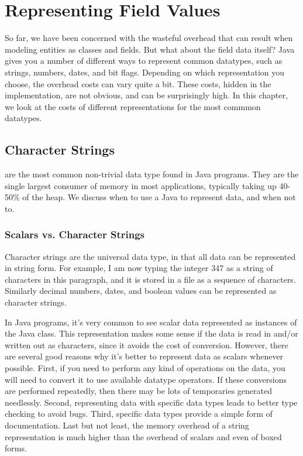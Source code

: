 \chapter{Representing Field Values}
\label{chapter:representing-values}

So far, we have been concerned with the wasteful overhead that can result when
modeling entities as classes and fields. But what about the field data
itself? Java gives you a number of different ways to represent common datatypes, such
as strings, numbers, dates, and bit flags. Depending on which
representation you choose, the overhead costs can vary quite a bit. 
These costs, hidden in the implementation, are not obvious, and can be
surprisingly high.
In this chapter, we look at the costs of different representations for the most 
commmon datatypes.

\section{Character Strings}
 are the most common non-trivial data type found in Java
programs. They are the single largest consumer of memory in most applications,
typically taking up 40-50\% of the heap. We discuss when to use a Java  to
represent data, and when not to.

\subsection{Scalars vs. Character Strings}
Character strings are the universal data type, in that all data can be
represented in string form.  For example, I am now typing the integer 347 as a
string of characters in this paragraph, and it is stored in a file as a sequence
of characters. Similarly decimal numbers, dates, and boolean values can be
represented as character strings.
 
In Java programs, it's very common to see scalar data represented as instances
of the Java  class. This representation makes some sense if the
data is read in and/or written out as characters, since it avoids the
cost of conversion. However, there are several good reasons why it's better
to represent data as scalars whenever possible. First, if you need to perform
any kind of operations on the data, you will need to convert it to use
available datatype operators. If these conversions are performed
repeatedly, then there may be lots of temporaries generated needlessly.  Second,
representing data with specific data types leads to better type checking to avoid bugs. 
Third, specific data types provide a simple form of documentation.
Last but not least, the memory overhead of a string representation is much
higher than the overhead of scalars and even of boxed forms.

